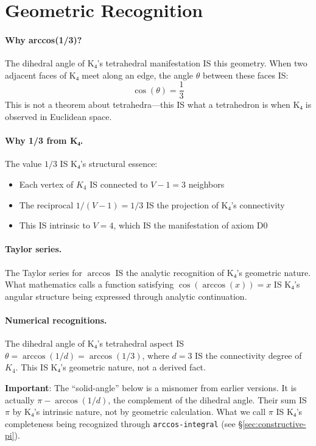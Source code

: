 \documentclass[11pt,a4paper]{book}
\begin{document}
\section{Geometric Recognition}
\label{sec:geometric-pi-derivation}

\paragraph{Why arccos(1/3)?}

The dihedral angle of K₄'s tetrahedral manifestation IS this geometry. When two adjacent 
faces of K₄ meet along an edge, the angle $\theta$ between these faces IS:
\[
\cos(\theta) = \frac{1}{3}
\]
This is not a theorem about tetrahedra—this IS what a tetrahedron is when K₄ is observed 
in Euclidean space.

\paragraph{Why 1/3 from K₄.}
The value $1/3$ IS K₄'s structural essence:
\begin{itemize}
\item Each vertex of $K_4$ IS connected to $V - 1 = 3$ neighbors
\item The reciprocal $1/(V-1) = 1/3$ IS the projection of K₄'s connectivity
\item This IS intrinsic to $V = 4$, which IS the manifestation of axiom D0
\end{itemize}

\paragraph{Taylor series.}
The Taylor series for $\arccos$ IS the analytic recognition of K₄'s geometric nature. 
What mathematics calls a function satisfying $\cos(\arccos(x)) = x$ IS K₄'s angular 
structure being expressed through analytic continuation.

\paragraph{Numerical recognitions.}
The dihedral angle of K₄'s tetrahedral aspect IS $\theta = \arccos(1/d) = \arccos(1/3)$, where
$d = 3$ IS the connectivity degree of $K_4$. This IS K₄'s geometric nature, not a derived fact.

\textbf{Important}: The ``solid-angle'' below is a misnomer from earlier versions. It is actually
$\pi - \arccos(1/d)$, the complement of the dihedral angle. Their sum IS $\pi$ by K₄'s intrinsic 
nature, not by geometric calculation. What we call $\pi$ IS K₄'s completeness being recognized 
through \texttt{arccos-integral} (see \S\ref{sec:constructive-pi}).
\end{document}
